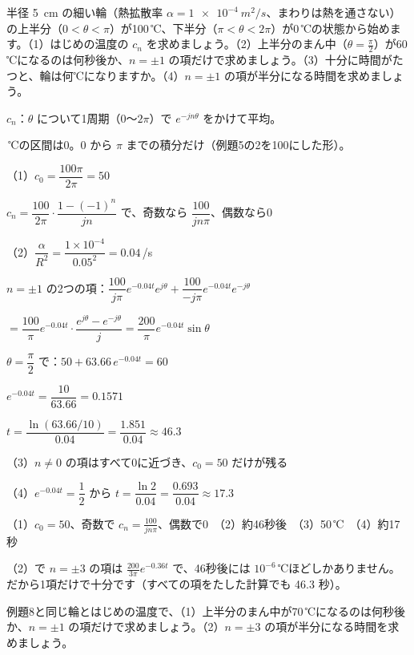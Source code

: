 \begin{reidai}[輪の熱]
半径 \qty{5}{cm} の細い輪（熱拡散率 $\alpha=\qty{1e-4}{m^2/s}$、まわりは熱を通さない）の上半分（$0<\theta<\pi$）が100\,℃、下半分（$\pi<\theta<2\pi$）が0\,℃の状態から始めます。（1）はじめの温度の $c_n$ を求めましょう。（2）上半分のまん中（$\theta=\frac{\pi}{2}$）が60\,℃になるのは何秒後か、$n=\pm1$ の項だけで求めましょう。（3）十分に時間がたつと、輪は何℃になりますか。（4）$n=\pm1$ の項が半分になる時間を求めましょう。\par
\kangaekata {}\par
{}\enspace $c_n$：$\theta$ について1周期（$0$〜$2\pi$）で $e^{-jn\theta}$ をかけて平均。\par
{}\,℃の区間は0。$0$ から $\pi$ までの積分だけ（例題5の2を100にした形）。\par
\shiki\kixds{}\zw{} （1）$c_0=\dfrac{100\pi}{2\pi}=50$\par
\kixdb $c_n=\dfrac{100}{2\pi}\cdot\dfrac{1-(-1)^n}{jn}$ で、奇数なら $\dfrac{100}{jn\pi}$、偶数なら0\par
\kixda （2）$\dfrac{\alpha}{R^2}=\dfrac{1\times10^{-4}}{0.05^2}=0.04$\,/s\par
\kixdb $n=\pm1$ の2つの項：$\dfrac{100}{j\pi}e^{-0.04t}e^{j\theta}+\dfrac{100}{-j\pi}e^{-0.04t}e^{-j\theta}$\par
\kixdb $=\dfrac{100}{\pi}e^{-0.04t}\cdot\dfrac{e^{j\theta}-e^{-j\theta}}{j}=\dfrac{200}{\pi}e^{-0.04t}\sin\theta$\par
\kixdb $\theta=\dfrac{\pi}{2}$ で：$50+63.66\,e^{-0.04t}=60$\par
\kixdb $e^{-0.04t}=\dfrac{10}{63.66}=0.1571$\par
\kixdb $t=\dfrac{\ln(63.66/10)}{0.04}=\dfrac{1.851}{0.04}\approx46.3$\par
\kixda （3）$n\neq0$ の項はすべて0に近づき、$c_0=50$ だけが残る\par
\kixda （4）$e^{-0.04t}=\dfrac12$ から $t=\dfrac{\ln2}{0.04}=\dfrac{0.693}{0.04}\approx17.3$\par
\kotae （1）$c_0=50$、奇数で $c_n=\tfrac{100}{jn\pi}$、偶数で0　（2）約46秒後　（3）50\,℃　（4）約17秒
\end{reidai}

{\small （2）で $n=\pm3$ の項は $\tfrac{200}{3\pi}e^{-0.36t}$ で、46秒後には $10^{-6}$\,℃ほどしかありません。だから1項だけで十分です（すべての項をたした計算でも 46.3 秒）。}

\begin{jibun}
例題8と同じ輪とはじめの温度で、（1）上半分のまん中が70\,℃になるのは何秒後か、$n=\pm1$ の項だけで求めましょう。（2）$n=\pm3$ の項が半分になる時間を求めましょう。
\end{jibun}



